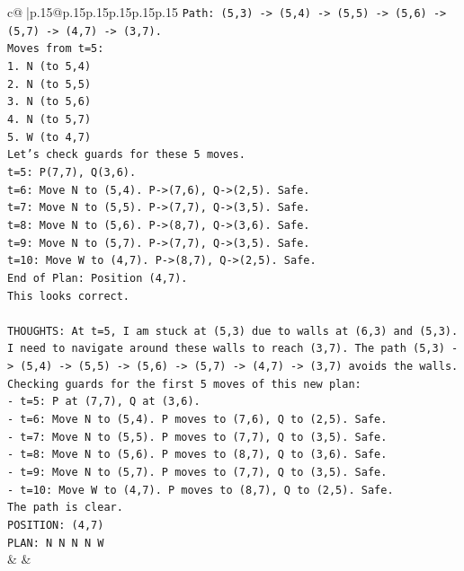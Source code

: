 \documentclass{article}
\begin{document}
{\begin{supertabular}{c@{$\;$}|p{.15\linewidth}@{}p{.15\linewidth}p{.15\linewidth}p{.15\linewidth}p{.15\linewidth}p{.15\linewidth}}
{{{\texttt{Path: (5,3) {-}> (5,4) {-}> (5,5) {-}> (5,6) {-}> (5,7) {-}> (4,7) {-}> (3,7).} \\
\texttt{Moves from t=5:} \\
\texttt{1. N (to 5,4)} \\
\texttt{2. N (to 5,5)} \\
\texttt{3. N (to 5,6)} \\
\texttt{4. N (to 5,7)} \\
\texttt{5. W (to 4,7)} \\
\texttt{Let's check guards for these 5 moves.} \\
\texttt{t=5: P(7,7), Q(3,6).} \\
\texttt{t=6: Move N to (5,4). P{-}>(7,6), Q{-}>(2,5). Safe.} \\
\texttt{t=7: Move N to (5,5). P{-}>(7,7), Q{-}>(3,5). Safe.} \\
\texttt{t=8: Move N to (5,6). P{-}>(8,7), Q{-}>(3,6). Safe.} \\
\texttt{t=9: Move N to (5,7). P{-}>(7,7), Q{-}>(3,5). Safe.} \\
\texttt{t=10: Move W to (4,7). P{-}>(8,7), Q{-}>(2,5). Safe.} \\
\texttt{End of Plan: Position (4,7).} \\
\texttt{This looks correct.} \\
\\ 
\texttt{THOUGHTS: At t=5, I am stuck at (5,3) due to walls at (6,3) and (5,3). I need to navigate around these walls to reach (3,7). The path (5,3) {-}> (5,4) {-}> (5,5) {-}> (5,6) {-}> (5,7) {-}> (4,7) {-}> (3,7) avoids the walls.} \\
\texttt{Checking guards for the first 5 moves of this new plan:} \\
\texttt{{-} t=5: P at (7,7), Q at (3,6).} \\
\texttt{{-} t=6: Move N to (5,4). P moves to (7,6), Q to (2,5). Safe.} \\
\texttt{{-} t=7: Move N to (5,5). P moves to (7,7), Q to (3,5). Safe.} \\
\texttt{{-} t=8: Move N to (5,6). P moves to (8,7), Q to (3,6). Safe.} \\
\texttt{{-} t=9: Move N to (5,7). P moves to (7,7), Q to (3,5). Safe.} \\
\texttt{{-} t=10: Move W to (4,7). P moves to (8,7), Q to (2,5). Safe.} \\
\texttt{The path is clear.} \\
\texttt{POSITION: (4,7)} \\
\texttt{PLAN: N N N N W} \\
            }
        }
    }
    & & \\ \\


\end{supertabular}}
\end{document}
